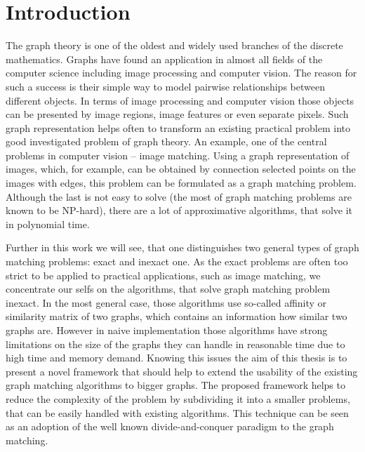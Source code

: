 \chapter{Introduction}
The graph theory is one of the oldest and widely used branches of the discrete mathematics. Graphs have found an application in almost all fields of the computer science including image processing and computer vision. The reason for such a success is their simple way to model pairwise relationships between different objects. In terms of image processing and computer vision those objects can be presented by image regions, image features or even separate pixels. Such graph representation helps often to transform an existing practical problem into good investigated problem of graph theory. An example, one of the central problems in computer vision -- image matching. %
Using a graph representation of images, which, for example, can be obtained by connection selected points on the images with edges, this problem can be formulated as a graph matching problem. Although the last is not easy to solve (the most of graph matching problems are known to be NP-hard), there are a lot of approximative algorithms, that solve it in polynomial time.

Further in this work we will see, that one distinguishes two general types of graph matching problems: exact and inexact one. As the exact problems are often too strict to be applied to practical applications, such as image matching, we concentrate our selfs on the algorithms, that solve graph matching problem inexact.
In the most general case, those algorithms use so-called affinity or similarity matrix of two graphs, which contains an information how similar two graphs are.
However in naive implementation those algorithms have strong limitations on the size of the graphs they can handle in reasonable time due to high time and memory demand. Knowing this issues the aim of this thesis is to present a novel framework that should help to extend the usability of the existing graph matching algorithms to bigger graphs. The proposed framework helps to reduce the complexity of the problem by subdividing it into a smaller problems, that can be easily handled with existing algorithms. This technique can be seen as an adoption of the well known divide-and-conquer paradigm to the graph matching.

